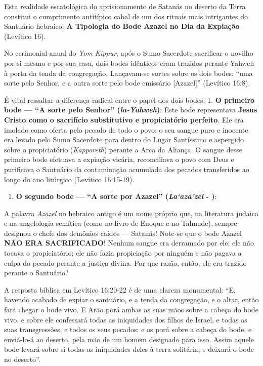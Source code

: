 \documentclass[11pt,a4paper,openany]{book}
\begin{document}
Esta realidade escatológica do aprisionamento de Satanás no deserto da Terra constitui o cumprimento antitípico cabal de um dos rituais mais intrigantes do Santuário hebraico: \textbf{A Tipologia do Bode Azazel no Dia da Expiação} (Levítico 16).

No cerimonial anual do \textit{Yom Kippur}, após o Sumo Sacerdote sacrificar o novilho por si mesmo e por sua casa, dois bodes idênticos eram trazidos perante Yahweh à porta da tenda da congregação. Lançavam-se sortes sobre os dois bodes: ``uma sorte pelo Senhor, e a outra sorte pelo bode emissário [Azazel]'' (Levítico 16:8).

É vital ressaltar a diferença radical entre o papel dos dois bodes:
1. \textbf{O primeiro bode — ``A sorte pelo Senhor'' (\textit{la-Yahweh})}: Este bode representava \textbf{Jesus Cristo como o sacrifício substitutivo e propiciatório perfeito}. Ele era imolado como oferta pelo pecado de todo o povo; o seu sangue puro e inocente era levado pelo Sumo Sacerdote para dentro do Lugar Santíssimo e aspergido sobre o propiciatório (\textit{Kapporeth}) perante a Arca da Aliança. O sangue desse primeiro bode efetuava a expiação vicária, reconciliava o povo com Deus e purificava o Santuário da contaminação acumulada dos pecados transferidos ao longo do ano litúrgico (Levítico 16:15-19).
\begin{enumerate}
  \item \textbf{O segundo bode — ``A sorte por Azazel'' (\textit{La‘azā’zēl} - )}:
\end{enumerate}

A palavra \textit{Azazel} no hebraico antigo é um nome próprio que, na literatura judaica e na angelologia semítica (como no livro de Enoque e no Talmude), sempre designou o chefe dos demônios caídos — Satanás!
Note-se que o bode Azazel \textbf{NÃO ERA SACRIFICADO}! Nenhum sangue era derramado por ele; ele não tocava o propiciatório; ele não fazia propiciação por ninguém e não pagava a culpa do pecado perante a justiça divina. Por que razão, então, ele era trazido perante o Santuário?

A resposta bíblica em Levítico 16:20-22 é de uma clareza monumental:
``E, havendo acabado de expiar o santuário, e a tenda da congregação, e o altar, então fará chegar o bode vivo. E Arão porá ambas as suas mãos sobre a cabeça do bode vivo, e sobre ele confessará todas as iniquidades dos filhos de Israel, e todas as suas transgressões, e todos os seus pecados; e os porá sobre a cabeça do bode, e enviá-lo-á ao deserto, pela mão de um homem designado para isso. Assim aquele bode levará sobre si todas as iniquidades deles à terra solitária; e deixará o bode no deserto''.
\end{document}
